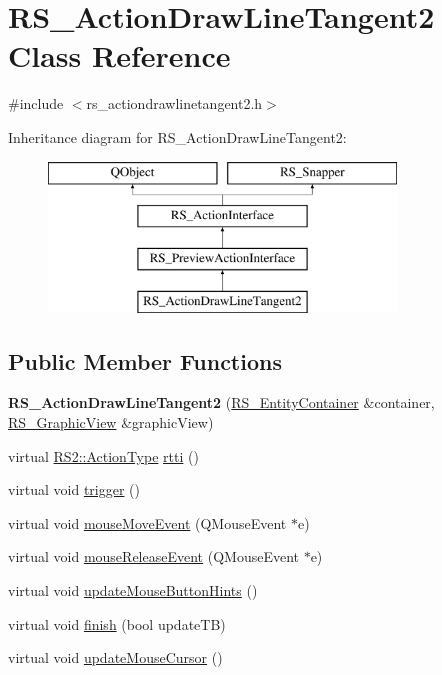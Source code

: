 \hypertarget{classRS__ActionDrawLineTangent2}{\section{R\-S\-\_\-\-Action\-Draw\-Line\-Tangent2 Class Reference}
\label{classRS__ActionDrawLineTangent2}
}


{\ttfamily \#include $<$rs\-\_\-actiondrawlinetangent2.\-h$>$}

Inheritance diagram for R\-S\-\_\-\-Action\-Draw\-Line\-Tangent2\-:\begin{figure}[H]
\begin{center}
\leavevmode
\includegraphics[height=4.000000cm]{classRS__ActionDrawLineTangent2}
\end{center}
\end{figure}
\subsection*{Public Member Functions}
\begin{DoxyCompactItemize}
\item 
\hypertarget{classRS__ActionDrawLineTangent2_a99bc175c18a3b711c8c1a617c2c748b6}{{\bfseries R\-S\-\_\-\-Action\-Draw\-Line\-Tangent2} (\hyperlink{classRS__EntityContainer}{R\-S\-\_\-\-Entity\-Container} \&container, \hyperlink{classRS__GraphicView}{R\-S\-\_\-\-Graphic\-View} \&graphic\-View)}\label{classRS__ActionDrawLineTangent2_a99bc175c18a3b711c8c1a617c2c748b6}

\item 
virtual \hyperlink{classRS2_afe3523e0bc41fd637b892321cfc4b9d7}{R\-S2\-::\-Action\-Type} \hyperlink{classRS__ActionDrawLineTangent2_a5c35ef195c73ab83bebd6c683262398b}{rtti} ()
\item 
virtual void \hyperlink{classRS__ActionDrawLineTangent2_ac67b98988b96ade25ae7190aa215382a}{trigger} ()
\item 
virtual void \hyperlink{classRS__ActionDrawLineTangent2_a0baa75a6327ccebc0507208ccfe938f3}{mouse\-Move\-Event} (Q\-Mouse\-Event $\ast$e)
\item 
virtual void \hyperlink{classRS__ActionDrawLineTangent2_a483fc0c1655686726653c75bb235d917}{mouse\-Release\-Event} (Q\-Mouse\-Event $\ast$e)
\item 
virtual void \hyperlink{classRS__ActionDrawLineTangent2_a3667693c4fb7dde0a40e8fc70b818312}{update\-Mouse\-Button\-Hints} ()
\item 
virtual void \hyperlink{classRS__ActionDrawLineTangent2_a09835ee8441f86ca2abf2cf814c75714}{finish} (bool update\-T\-B)
\item 
virtual void \hyperlink{classRS__ActionDrawLineTangent2_a6dd290239718b1812f6385abdf614689}{update\-Mouse\-Cursor} ()
\end{DoxyCompactItemize}
